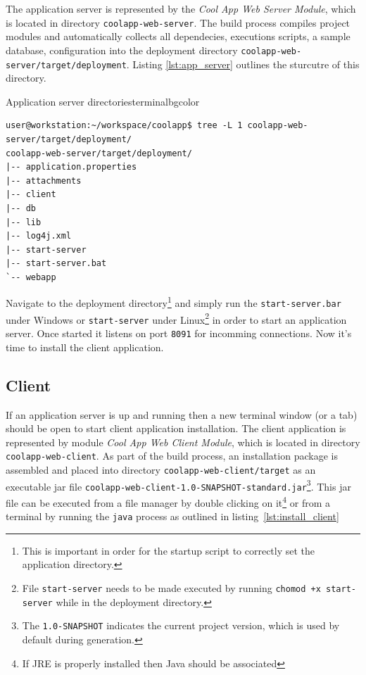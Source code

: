   The application server is represented by the \emph{Cool App Web Server Module}, which is located in directory \texttt{coolapp-web-server}.
  The build process compiles project modules and automatically collects all dependecies, executions scripts, a sample database, configuration into the deployment directory \texttt{coolapp-web-server/target/deployment}.
  Listing \ref{lst:app_server} outlines the sturcutre of this directory.

  \begin{code}{Application server directories}{\label{lst:app_server}}{terminalbgcolor}
     \begin{lstlisting}
user@workstation:~/workspace/coolapp$ tree -L 1 coolapp-web-server/target/deployment/
coolapp-web-server/target/deployment/
|-- application.properties
|-- attachments
|-- client
|-- db
|-- lib
|-- log4j.xml
|-- start-server
|-- start-server.bat
`-- webapp
     \end{lstlisting}
  \end{code}

  Navigate to the deployment directory\footnote{This is important in order for the startup script to correctly set the application directory.} and simply run the \texttt{start-server.bar} under Windows or \texttt{start-server} under Linux\footnote{File \texttt{start-server} needs to be made executed by running \texttt{chomod +x start-server} while in the deployment directory.} in order to start an application server.
  Once started it listens on port \texttt{8091} for incomming connections.
  Now it's time to install the client application.

\subsection{Client}
  \sloppypar
  If an application server is up and running then a new terminal window (or a tab) should be open to start client application installation.
  The client application is represented by module \emph{Cool App Web Client Module}, which is located in directory \texttt{coolapp-web-client}.
  As part of the build process, an installation package is assembled and placed into directory \texttt{coolapp-web-client/target} as an executable jar file \texttt{coolapp-web-client-1.0-SNAPSHOT-standard.jar}\footnote{The \texttt{1.0-SNAPSHOT} indicates the current project version, which is used by default during generation.}.   
  This jar file can be executed from a file manager by double clicking on it\footnote{If JRE is properly installed then Java should be associated} or from a terminal by running the \texttt{java} process as outlined in listing~\ref{lst:install_client}

